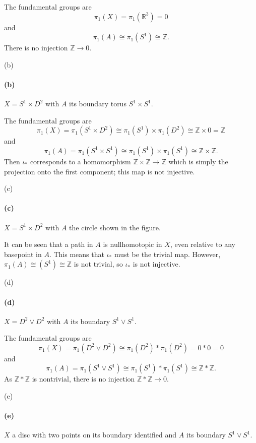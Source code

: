 \documentclass[12pt]{article}
\newlength{\myparskip}
\newenvironment{fullbox}{\begin{lrbox}{\savefullbox}\begin{minipage}{\dimexpr\textwidth-2\fboxsep\relax}\setlength{\parskip}{\myparskip}}{\end{minipage}\end{lrbox}\framebox[\textwidth]{\usebox{\savefullbox}}}
\newenvironment{pbox}[1][]{\begin{fullbox}\ifx#1\empty\else\paragraph{#1}\phantom{}\fi}{\end{fullbox}}
\theoremstyle{definition}
\newcommand{\Z}{\mathbb{Z}}
\newcommand{\R}{\mathbb{R}}
\newcommand{\<}{\langle}
\renewcommand{\>}{\rangle}
\newcommand{\isom}{\cong}
\begin{document}
The fundamental groups are
\[
    \pi_1(X) = \pi_1(\R^3) = 0
\]
and
\[
    \pi_1(A) \isom \pi_1(S^1) \isom \Z.
\]
There is no injection $\Z \to 0$.

\begin{pbox}[(b)]
    $X = S^1 \times D^2$ with $A$ its boundary torus  $S^1 \times S^1$.
\end{pbox}

The fundamental groups are
\[
    \pi_1(X)
        = \pi_1(S^1 \times D^2)
        \isom \pi_1(S^1) \times \pi_1(D^2)
        \isom \Z \times 0
        = \Z
\]
and
\[
    \pi_1(A)
        = \pi_1(S^1 \times S^1)
        \isom \pi_1(S^1) \times \pi_1(S^1)
        \isom \Z \times \Z.
\]
Then $\iota_*$ corresponds to a homomorphism $\Z \times \Z \to \Z$ which is simply the projection onto the first component; this map is not injective.

\begin{pbox}[(c)]
    $X = S^1 \times D^2$ with $A$ the circle shown in the figure.
\end{pbox}

It can be seen that a path in $A$ is nullhomotopic in $X$, even relative to any basepoint in $A$.
This means that $\iota_*$ must be the trivial map.
However, $\pi_1(A) \isom(S^1) \isom \Z$ is not trivial, so $\iota_*$ is not injective.

\begin{pbox}[(d)]
    $X = D^2 \vee D^2$ with $A$ its boundary $S^1 \vee S^1$.
\end{pbox}

The fundamental groups are
\[
    \pi_1(X)
        = \pi_1(D^2 \vee D^2)
        \isom \pi_1(D^2) * \pi_1(D^2)
        = 0 * 0
        = 0
\]
and
\[
    \pi_1(A)
        = \pi_1(S^1 \vee S^1)
        \isom \pi_1(S^1) * \pi_1(S^1)
        \isom \Z * \Z.
\]
As $\Z * \Z$ is nontrivial, there is no injection $\Z * \Z \to 0$.

\begin{pbox}[(e)]
    $X$ a disc with two points on its boundary identified and $A$ its boundary $S^1 \vee S^1$.
\end{pbox}
\end{document}

